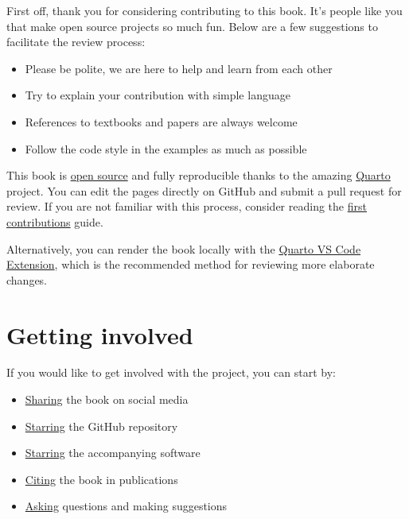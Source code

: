 \documentclass[
  letterpaper,
  DIV=11,
  numbers=noendperiod]{scrreprt}
\providecommand{\tightlist}{%
  \setlength{\itemsep}{0pt}\setlength{\parskip}{0pt}}\usepackage{longtable,booktabs,array}
\begin{document}

First off, thank you for considering contributing to this book. It's
people like you that make open source projects so much fun. Below are a
few suggestions to facilitate the review process:

\begin{itemize}
\tightlist
\item
  Please be polite, we are here to help and learn from each other
\item
  Try to explain your contribution with simple language
\item
  References to textbooks and papers are always welcome
\item
  Follow the code style in the examples as much as possible
\end{itemize}

This book is
\href{https://github.com/juliohm/geospatial-data-science-with-julia}{open
source} and fully reproducible thanks to the amazing
\href{https://quarto.org}{Quarto} project. You can edit the pages
directly on GitHub and submit a pull request for review. If you are not
familiar with this process, consider reading the
\href{https://github.com/firstcontributions/first-contributions}{first
contributions} guide.

Alternatively, you can render the book locally with the
\href{https://marketplace.visualstudio.com/items?itemName=quarto.quarto}{Quarto
VS Code Extension}, which is the recommended method for reviewing more
elaborate changes.

\hypertarget{getting-involved}{%
\section*{Getting involved}\label{getting-involved}}


If you would like to get involved with the project, you can start by:

\begin{itemize}
\tightlist
\item
  \href{}{Sharing} the book on social media
\item
  \href{https://github.com/juliohm/geospatial-data-science-with-julia}{Starring}
  the GitHub repository
\item
  \href{https://github.com/JuliaEarth/GeoStats.jl}{Starring} the
  accompanying software
\item
  \href{CITATION.bib}{Citing} the book in publications
\item
  \href{https://github.com/juliohm/geospatial-data-science-with-julia}{Asking}
  questions and making suggestions
\end{itemize}
\end{document}
